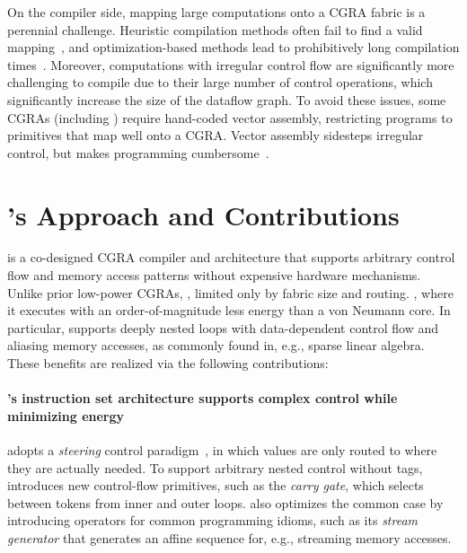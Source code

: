 On the compiler side, mapping large computations onto a CGRA fabric is a 
perennial challenge.
%
Heuristic compilation methods often fail to find a valid
mapping~\cite{chlorophyll,nowatzki2018hybrid}, and optimization-based methods lead to
prohibitively long compilation times~\cite{nowatzki2018hybrid,cgrame-ilp}.
%
Moreover, computations with irregular control flow are significantly
more challenging to compile due to their large number of control
operations, which significantly increase the size of the dataflow
graph.
%
To avoid these issues, some CGRAs (including \snafu) require
hand-coded vector assembly, restricting programs to
primitives that map well onto a CGRA.
%
Vector assembly sidesteps irregular control,
but makes programming cumbersome~\cite{snafu,yang2021spzip,nowatzki:isca17:stream-dataflow}.


\section*{\riptide's Approach and Contributions}

\riptide is a co-designed CGRA compiler and architecture that
supports arbitrary control flow and memory access patterns
without expensive hardware mechanisms.
%
Unlike prior low-power CGRAs, , limited only by fabric size and routing.
%
,
where it executes with an order-of-magnitude less energy than a von
Neumann core.
%
In particular, \riptide supports deeply nested loops with
data-dependent control flow and aliasing memory accesses,
as commonly found in, e.g., sparse linear algebra.
%
These benefits are realized via the following contributions:

\paragraph{\riptide's instruction set architecture supports complex control while minimizing energy}

%
\riptide adopts a \emph{steering} control
paradigm~\cite{dennis1975preliminary,swanson2003wavescalar,budiu2005dataflow},
in which values are only routed to where they are actually needed.
%
To support arbitrary nested control without tags, \riptide introduces new
control-flow primitives, such as the \emph{carry gate}, which selects
between tokens from inner and outer loops.
%
\riptide also optimizes the common case by introducing operators for
common programming idioms, such as its \emph{stream generator} that
generates an affine sequence for, e.g., streaming memory accesses.

